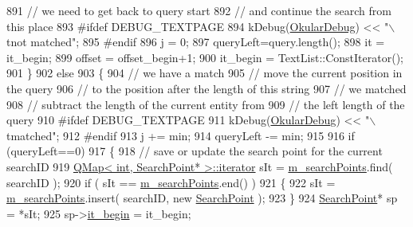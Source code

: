 \begin{DoxyCode}
891                     \textcolor{comment}{// we need to get back to query start}
892                     \textcolor{comment}{// and continue the search from this place}
893 \textcolor{preprocessor}{#ifdef DEBUG\_TEXTPAGE}
894             kDebug(\hyperlink{debug__p_8h_af16c6e32a95969dd0605d792ec9807c7}{OkularDebug}) << \textcolor{stringliteral}{"\(\backslash\)tnot matched"};
895 \textcolor{preprocessor}{#endif}
896                     j = 0;
897                     queryLeft=query.length();
898                     it = it\_begin;
899                     offset = offset\_begin+1;
900                     it\_begin = TextList::ConstIterator();
901             \}
902             \textcolor{keywordflow}{else}
903             \{
904                     \textcolor{comment}{// we have a match}
905                     \textcolor{comment}{// move the current position in the query}
906                     \textcolor{comment}{// to the position after the length of this string}
907                     \textcolor{comment}{// we matched}
908                     \textcolor{comment}{// subtract the length of the current entity from }
909                     \textcolor{comment}{// the left length of the query}
910 \textcolor{preprocessor}{#ifdef DEBUG\_TEXTPAGE}
911             kDebug(\hyperlink{debug__p_8h_af16c6e32a95969dd0605d792ec9807c7}{OkularDebug}) << \textcolor{stringliteral}{"\(\backslash\)tmatched"};
912 \textcolor{preprocessor}{#endif}
913                     j += min;
914                     queryLeft -= min;
915 
916                     \textcolor{keywordflow}{if} (queryLeft==0)
917                     \{
918                         \textcolor{comment}{// save or update the search point for the current searchID}
919                         \hyperlink{classQMap}{QMap< int, SearchPoint* >::iterator} sIt = 
      \hyperlink{classOkular_1_1TextPagePrivate_a4cd8e4b3be609ba6f03c8c85963d7b6e}{m\_searchPoints}.find( searchID );
920                         \textcolor{keywordflow}{if} ( sIt == \hyperlink{classOkular_1_1TextPagePrivate_a4cd8e4b3be609ba6f03c8c85963d7b6e}{m\_searchPoints}.end() )
921                         \{
922                             sIt = \hyperlink{classOkular_1_1TextPagePrivate_a4cd8e4b3be609ba6f03c8c85963d7b6e}{m\_searchPoints}.insert( searchID, \textcolor{keyword}{new} 
      \hyperlink{classSearchPoint}{SearchPoint} );
923                         \}
924                         \hyperlink{classSearchPoint}{SearchPoint}* sp = *sIt;
925                         sp->\hyperlink{classSearchPoint_a2fbb5753fdf7adba3318560e9199f502}{it\_begin} = it\_begin;

\end{DoxyCode}

